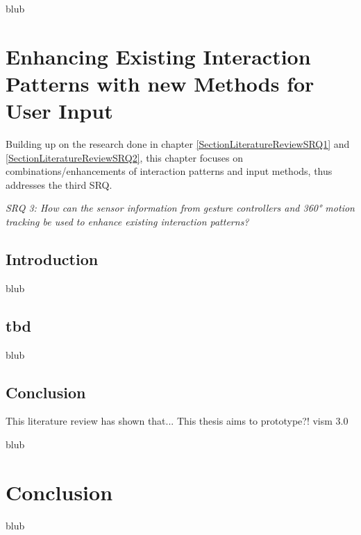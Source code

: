 blub




\section{Enhancing Existing Interaction Patterns with new Methods for User Input}

\label{SectionLiteratureReviewSRQ3}

Building up on the research done in chapter \ref{SectionLiteratureReviewSRQ1} and \ref{SectionLiteratureReviewSRQ2}, this  chapter focuses on combinations/enhancements of interaction patterns and input methods, thus addresses the third SRQ.
\begin{framed}
	\textit{SRQ 3: How can the sensor information from gesture controllers and 360° motion tracking be used to enhance existing interaction patterns?}
\end{framed}



\subsection{Introduction}

blub



\subsection{tbd}

blub


\subsection{Conclusion}

This literature review has shown that...
\newline
This thesis aims to prototype?!
\newline
\gls{vism} 3.0

blub





\section{Conclusion}

\label{SectionLiteratureReviewConclusion}

blub

